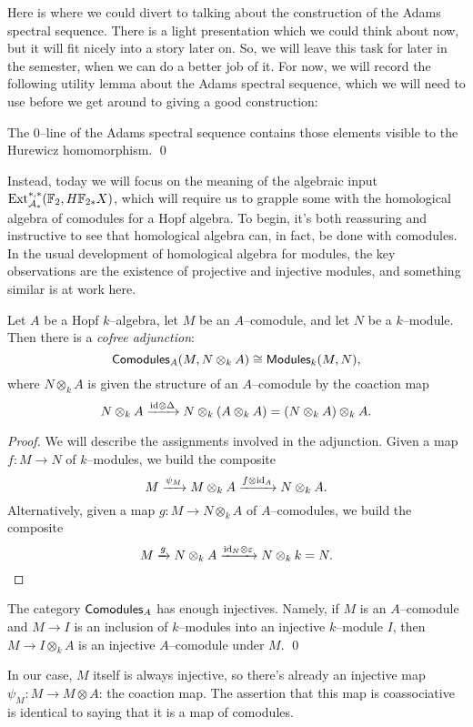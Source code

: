 Here is where we could divert to talking about the construction of the Adams spectral sequence.  There is a light presentation which we could think about now, but it will fit nicely into a story later on.  So, we will leave this task for later in the semester, when we can do a better job of it.  For now, we will record the following utility lemma about the Adams spectral sequence, which we will need to use before we get around to giving a good construction:
\begin{lemma}
The $0$--line of the Adams spectral sequence contains those elements visible to the Hurewicz homomorphism. \qed {}
\end{lemma}

Instead, today we will focus on the meaning of the algebraic input $\operatorname{Ext}_{\mathcal A_*}^{*, *}(\mathbb F_2, H\mathbb F_{2*} X)$, which will require us to grapple some with the homological algebra of comodules for a Hopf algebra.  To begin, it's both reassuring and instructive to see that homological algebra can, in fact, be done with comodules.  In the usual development of homological algebra for modules, the key observations are the existence of projective and injective modules, and something similar is at work here.
\begin{lemma}
Let $A$ be a Hopf $k$--algebra, let $M$ be an $A$--comodule, and let $N$ be a $k$--module.  Then there is a \textit{cofree adjunction}: \[\mathsf{Comodules}_A(M, N \otimes_k A) \cong \mathsf{Modules}_k(M, N),\] where $N \otimes_k A$ is given the structure of an $A$--comodule by the coaction map \[N \otimes_k A \xrightarrow{\mathrm{id} \otimes \Delta} N \otimes_k (A \otimes_k A) = (N \otimes_k A) \otimes_k A.\]
\end{lemma}
\begin{proof}
We will describe the assignments involved in the adjunction.  Given a map $f: M \to N$ of $k$--modules, we build the composite \[M \xrightarrow{\psi_M} M \otimes_k A \xrightarrow{f \otimes \mathrm{id}_A} N \otimes_k A.\]  Alternatively, given a map $g: M \to N \otimes_k A$ of $A$--comodules, we build the composite \[M \xrightarrow{g} N \otimes_k A \xrightarrow{\mathrm{id}_N \otimes \varepsilon} N \otimes_k k = N. \qedhere\]
\end{proof}

\begin{corollary}
The category $\mathsf{Comodules}_A$ has enough injectives.  Namely, if $M$ is an $A$--comodule and $M \to I$ is an inclusion of $k$--modules into an injective $k$--module $I$, then $M \to I \otimes_k A$ is an injective $A$--comodule under $M$. \qed
\end{corollary}
\begin{remark}
In our case, $M$ itself is always injective, so there's already an injective map $\psi_M: M \to M \otimes A$: the coaction map.  The assertion that this map is coassociative is identical to saying that it is a map of comodules.
\end{remark}


